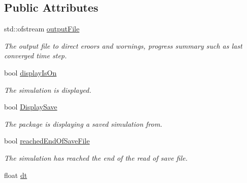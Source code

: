 \subsection*{Public Attributes}
\begin{DoxyCompactItemize}
\item 
\hypertarget{classSimulation_a473866f52cbbb0f5186f4b2a4ac451ee}{}std\+::ofstream \hyperlink{classSimulation_a473866f52cbbb0f5186f4b2a4ac451ee}{output\+File}\label{classSimulation_a473866f52cbbb0f5186f4b2a4ac451ee}

\begin{DoxyCompactList}\small\item\em The output file to direct eroors and wornings, progress summary such as last converged time step. \end{DoxyCompactList}\item 
\hypertarget{classSimulation_a219f980877f9cf37de32556b5bce836a}{}bool \hyperlink{classSimulation_a219f980877f9cf37de32556b5bce836a}{display\+Is\+On}\label{classSimulation_a219f980877f9cf37de32556b5bce836a}

\begin{DoxyCompactList}\small\item\em The simulation is displayed. \end{DoxyCompactList}\item 
\hypertarget{classSimulation_ab4d07267bab8e631658e2ef056ee5750}{}bool \hyperlink{classSimulation_ab4d07267bab8e631658e2ef056ee5750}{Display\+Save}\label{classSimulation_ab4d07267bab8e631658e2ef056ee5750}

\begin{DoxyCompactList}\small\item\em The package is displaying a saved simulation from. \end{DoxyCompactList}\item 
\hypertarget{classSimulation_a99b66ca81fcc16dab7f44632ddff7ecd}{}bool \hyperlink{classSimulation_a99b66ca81fcc16dab7f44632ddff7ecd}{reached\+End\+Of\+Save\+File}\label{classSimulation_a99b66ca81fcc16dab7f44632ddff7ecd}

\begin{DoxyCompactList}\small\item\em The simulation has reached the end of the read of save file. \end{DoxyCompactList}\item 
\hypertarget{classSimulation_a0ee381efb3458d02bf78487cbb4dc42a}{}float \hyperlink{classSimulation_a0ee381efb3458d02bf78487cbb4dc42a}{dt}\label{classSimulation_a0ee381efb3458d02bf78487cbb4dc42a}


\end{DoxyCompactItemize}
